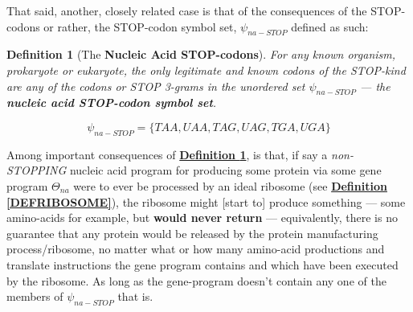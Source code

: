 \documentclass[a4paper, 18pt]{book} %
\newtheorem{defn}{Definition}
\begin{document}
That said, another, closely related case is that of the consequences of the STOP-codons or rather, the STOP-codon symbol set, $\psi_{na-STOP}$ defined as such:

\vspace{1em}

\begin{defn}[The \textbf{Nucleic Acid STOP-codons}]
\label{DEFSTOPCOD}
For any known organism, prokaryote or eukaryote, the only legitimate and known codons of the STOP-kind are any of the codons or STOP 3-grams in the unordered set $\psi_{na-STOP}$ --- the \textbf{nucleic acid STOP-codon symbol set}.

\vspace{1em}

\begin{equation}
\label{EQNNASSSTOP}
\psi_{na-STOP} = \{TAA,UAA,TAG,UAG,TGA,UGA\}
\end{equation}
\end{defn} 

\vspace{1em}

Among important consequences of \textbf{\hyperref[DEFSTOPCOD]{Definition \ref{DEFSTOPCOD}}}, is that, if say a \textit{non-STOPPING} nucleic acid program for producing some protein via some gene program $\Theta_{na}$ were to ever be processed by an ideal ribosome (see \textbf{\hyperref[DEFRIBOSOME]{Definition \ref{DEFRIBOSOME}}}), the ribosome might [start to] produce something --- some amino-acids for example, but \textbf{would never return} --- equivalently, there is no guarantee that any protein would be released by the protein manufacturing process/ribosome, no matter what or how many amino-acid productions and translate instructions the gene program contains and which have been executed by the ribosome. As long as the gene-program doesn't contain any one of the members of $\psi_{na-STOP}$ that is.
\end{document}
